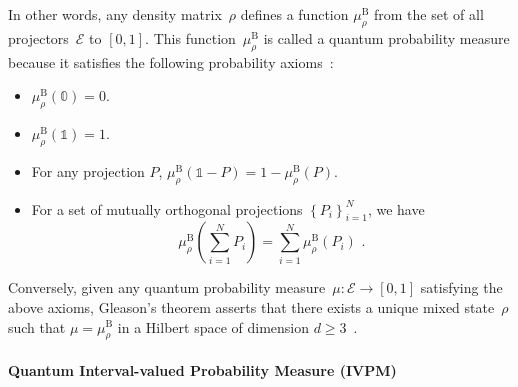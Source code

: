 \documentclass[english,reprint, aps, prl,superscriptaddress, showpacs,
showkeys]{revtex4-1}
\theoremstyle{plain}
\theoremstyle{definition}
\newcommand{\events}{\ensuremath{\mathcal{E}}}
\begin{document}
In other words, any density matrix~$\rho$ defines a function $\mu_{\rho}^{\mathrm{\mathrm{B}}}$
from the set of all projectors~$\events$ to $[0,1]$. This function~$\mu_{\rho}^{\mathrm{\mathrm{B}}}$
is called a quantum probability measure because it satisfies the following
probability axioms~\citep{10.2307/2308516,gleason1957,Redhead1987-REDINA,Maassen2010}: 
\begin{itemize}
\item $\mu_{\rho}^{\mathrm{\mathrm{B}}}(\mathbb{0})=0$. 
\item $\mu_{\rho}^{\mathrm{\mathrm{B}}}(\mathbb{1})=1$. 
\item For any projection $P$, $\mu_{\rho}^{\mathrm{\mathrm{B}}}\left(\mathbb{1}-P\right)=1-\mu_{\rho}^{\mathrm{\mathrm{B}}}\left(P\right)$. 
\item For a set of mutually orthogonal projections $\left\{ P_{i}\right\} _{i=1}^{N}$,
we have 
\begin{equation}
\mu_{\rho}^{\mathrm{\mathrm{B}}}\left(\sum_{i=1}^{N}P_{i}\right)=\sum_{i=1}^{N}\mu_{\rho}^{\mathrm{\mathrm{B}}}\left(P_{i}\right)\textrm{ .}\label{eq:QuantumProbability-Addition}
\end{equation}
\end{itemize}
Conversely, given any quantum probability measure~$\mu:\events\rightarrow[0,1]$
satisfying the above axioms, Gleason's theorem asserts that there
exists a unique mixed state~$\rho$ such that $\mu=\mu_{\rho}^{\mathrm{\mathrm{B}}}$
in a Hilbert space of dimension $d\geq3$~\citep{gleason1957,Redhead1987-REDINA,peres1995quantum}.

\paragraph{Quantum Interval-valued Probability Measure (IVPM)}
\end{document}
